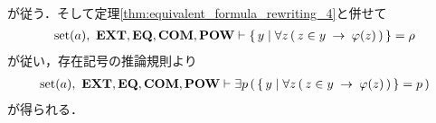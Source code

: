 \begin{sketch}
\begin{description}
\begin{align}
				\end{align}
				が従う．そして定理\ref{thm:equivalent_formula_rewriting_4}と併せて
				\begin{align}
					\operatorname*{set} (a),\ \mbox{{\bf EXT}},\mbox{{\bf EQ}},\mbox{\bf COM},\mbox{{\bf POW}} \vdash 
					\left\{\, y \mid \forall z\, (\, z \in y \hspace{0.25em}\rightarrow\hspace{0.25em} \varphi(z)\, )\, \right\} = \rho
				\end{align}
				が従い，存在記号の推論規則より
				\begin{align}
					\operatorname*{set} (a),\ \mbox{{\bf EXT}},\mbox{{\bf EQ}},\mbox{\bf COM},\mbox{{\bf POW}} \vdash \exists p\, 
					(\, \left\{\, y \mid \forall z\, (\, z \in y \hspace{0.25em}\rightarrow\hspace{0.25em} \varphi(z)\, )\, \right\} = p\, )
				\end{align}
				が得られる．
				\QED
		\end{description}
	\end{sketch}